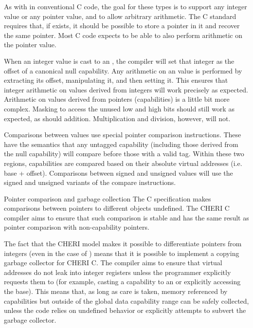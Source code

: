 As with  in conventional C code, the goal for these types is to support any integer value or any pointer value, and to allow arbitrary arithmetic.  The C standard requires that, if  exists, it should be possible to store a pointer in it and recover the same pointer.  Most C code expects to be able to also perform arithmetic on the pointer value.

When an integer value is cast to an , the compiler will set that integer as the offset of a canonical null capability.  Any arithmetic on an  value is performed by extracting its offset, manipulating it, and then setting it.  This ensures that integer arithmetic on  values derived from integers will work precisely as expected.  Arithmetic on values derived from pointers (capabilities) is a little bit more complex.  Masking to access the unused low and high bits should still work as expected, as should addition.  Multiplication and division, however, will not.

Comparisons between  values use special pointer comparison instructions.
These have the semantics that any untagged capability (including those derived from the null capability) will compare before those with a valid tag.
Within these two regions, capabilities are compared based on their absolute virtual addresses (i.e. base + offset).
Comparisons between signed and unsigned  values will use the signed and unsigned variants of the compare instructions.

\begin{notebox}{Pointer comparison and garbage collection}
The C specification makes comparisons between pointers to different objects undefined.
The CHERI C compiler aims to ensure that such comparison is stable and has the same result as pointer comparison with non-capability pointers.

The fact that the CHERI model makes it possible to differentiate pointers from integers (even in the case of ) means that it is possible to implement a copying garbage collector for CHERI C.
The compiler aims to ensure that virtual addresses do not leak into integer registers unless the programmer explicitly requests them to (for example, casting a capability to an  or explicitly accessing the base).
This means that, as long as care is taken, memory referenced by capabilities but outside of the global data capability range can be safely collected, unless the code relies on undefined behavior or explicitly attempts to subvert the garbage collector.
\end{notebox}

